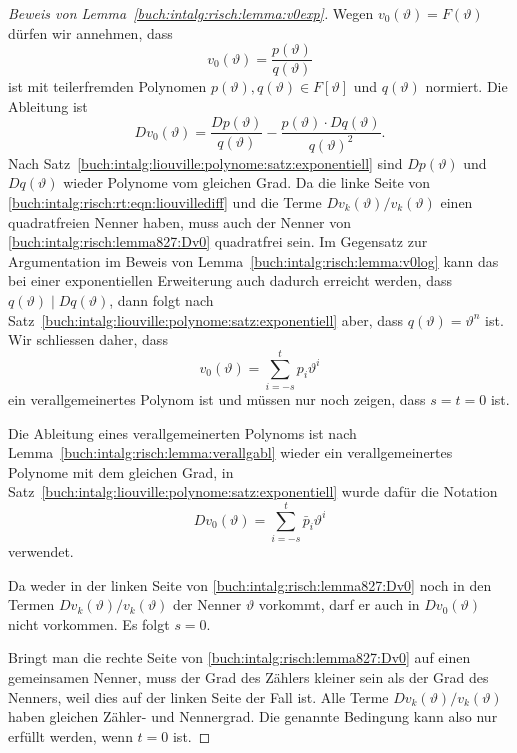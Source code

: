 \begin{proof}[Beweis von Lemma~\ref{buch:intalg:risch:lemma:v0exp}]
Wegen $v_0(\vartheta)=F(\vartheta)$ dürfen wir annehmen, dass
\[
v_0(\vartheta) = \frac{p(\vartheta)}{q(\vartheta)}
\]
ist mit teilerfremden Polynomen $p(\vartheta),q(\vartheta)\in F[\vartheta]$
und $q(\vartheta)$ normiert.
Die Ableitung ist
\begin{equation}
Dv_0(\vartheta)
=
\frac{Dp(\vartheta)}{q(\vartheta)}
-
\frac{p(\vartheta)\cdot Dq(\vartheta)}{q(\vartheta)^2}.
\label{buch:intalg:risch:lemma827:Dv0}
\end{equation}
Nach Satz~\ref{buch:intalg:liouville:polynome:satz:exponentiell} sind
$Dp(\vartheta)$ und $Dq(\vartheta)$ wieder Polynome vom gleichen Grad.
Da die linke Seite von \eqref{buch:intalg:risch:rt:eqn:liouvillediff}
und die Terme $Dv_k(\vartheta)/v_k(\vartheta)$
einen quadratfreien Nenner haben, muss auch der Nenner von
\eqref{buch:intalg:risch:lemma827:Dv0} quadratfrei sein.
Im Gegensatz zur Argumentation im Beweis von
Lemma~\ref{buch:intalg:risch:lemma:v0log} kann das bei einer
exponentiellen Erweiterung auch dadurch erreicht werden, dass
$q(\vartheta)\mid Dq(\vartheta)$, dann folgt nach
Satz~\ref{buch:intalg:liouville:polynome:satz:exponentiell} aber,
dass $q(\vartheta)=\vartheta^n$ ist.
Wir schliessen daher, dass
\[
v_0(\vartheta)
=
\sum_{i=-s}^t p_i\vartheta^i
\]
ein verallgemeinertes Polynom ist und müssen nur noch zeigen, dass $s=t=0$ ist.

Die Ableitung eines verallgemeinerten Polynoms ist nach
Lemma~\ref{buch:intalg:risch:lemma:verallgabl}
wieder ein verallgemeinertes Polynome mit dem gleichen Grad, in
Satz~\ref{buch:intalg:liouville:polynome:satz:exponentiell}
wurde dafür die Notation
\[
Dv_0(\vartheta)
=
\sum_{i=-s}^t \bar{p}_i\vartheta^i
\]
verwendet.

Da weder in der linken Seite von \eqref{buch:intalg:risch:lemma827:Dv0}
noch in den Termen $Dv_k(\vartheta)/v_k(\vartheta)$ der Nenner $\vartheta$
vorkommt, darf er auch in $Dv_0(\vartheta)$ nicht vorkommen.
Es folgt $s=0$.

Bringt man die rechte Seite von \eqref{buch:intalg:risch:lemma827:Dv0}
auf einen gemeinsamen Nenner, muss der Grad des Zählers kleiner sein als
der Grad des Nenners, weil dies auf der linken Seite der Fall ist.
Alle Terme $Dv_k(\vartheta)/v_k(\vartheta)$ haben gleichen Zähler- und
Nennergrad.
Die genannte Bedingung kann also nur erfüllt werden, wenn $t=0$ ist.
\end{proof}

%
%
